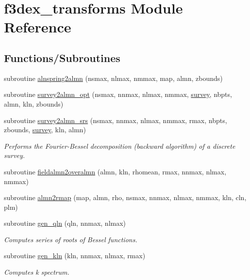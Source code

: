 \hypertarget{namespacef3dex__transforms}{
\section{f3dex\_\-transforms Module Reference}
\label{namespacef3dex__transforms}
}
\subsection*{Functions/Subroutines}
\begin{DoxyCompactItemize}
\item 
subroutine \hyperlink{namespacef3dex__transforms_aef309274871cf8eb0405b63f14ab26a2}{alnspring2almn} (nsmax, nlmax, nmmax, map, almn, zbounds)
\item 
subroutine \hyperlink{namespacef3dex__transforms_aa03041ae9480a0e4abc522b846a40cc8}{survey2almn\_\-opt} (nsmax, nnmax, nlmax, nmmax, \hyperlink{modulesurvey}{survey}, nbpts, almn, kln, zbounds)
\item 
subroutine \hyperlink{namespacef3dex__transforms_ae19f381573ccd64c64102bbd4181483f}{survey2almn\_\-srs} (nsmax, nnmax, nlmax, nmmax, rmax, nbpts, zbounds, \hyperlink{modulesurvey}{survey}, kln, almn)
\begin{DoxyCompactList}\small\item\em Performs the Fourier-\/Bessel decomposition (backward algorithm) of a discrete survey. \end{DoxyCompactList}\item 
subroutine \hyperlink{namespacef3dex__transforms_a4675d50d585b89b97772a0fa7dde4c5f}{fieldalmn2overalmn} (almn, kln, rhomean, rmax, nnmax, nlmax, nmmax)
\item 
subroutine \hyperlink{namespacef3dex__transforms_a3e792eb35f030b601d9262ac031cfdb9}{almn2rmap} (map, almn, rho, nsmax, nnmax, nlmax, nmmax, kln, cln, plm)
\item 
subroutine \hyperlink{namespacef3dex__transforms_a02b926f933d186f2c9d9ab6d478a1601}{gen\_\-qln} (qln, nnmax, nlmax)
\begin{DoxyCompactList}\small\item\em Computes series of roots of Bessel functions. \end{DoxyCompactList}\item 
subroutine \hyperlink{namespacef3dex__transforms_a4b80bc7cad52998fd0aff935a1695ee7}{gen\_\-kln} (kln, nnmax, nlmax, rmax)
\begin{DoxyCompactList}\small\item\em Computes k spectrum. \end{DoxyCompactList}\item 

\end{DoxyCompactItemize}
